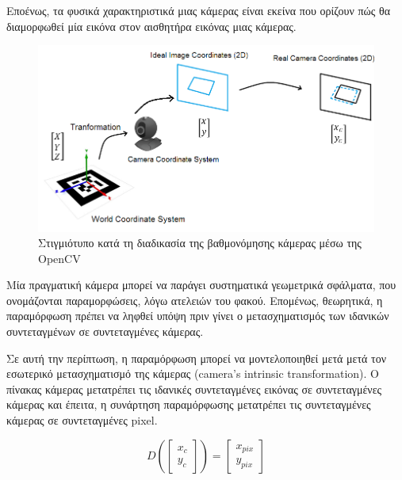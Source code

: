 Εποένως, τα φυσικά χαρακτηριστικά μιας κάμερας είναι εκείνα που ορίζουν πώς θα διαμορφωθεί μία εικόνα στον αισθητήρα εικόνας μιας κάμερας. 








\begin{figure}[H]
    \centering
    \includegraphics[scale=0.6, angle=0]{Files/Figures/transformation1.png}
    \caption[Στιγμιότυπο κατά τη διαδικασία της βαθμονόμησης κάμερας μέσω της OpenCV]{ Στιγμιότυπο κατά τη διαδικασία της βαθμονόμησης κάμερας μέσω της OpenCV}
    \label{fig:transformation1}
\end{figure}









Mία πραγματική κάμερα μπορεί να παράγει συστηματικά γεωμετρικά σφάλματα, που ονομάζονται παραμορφώσεις, λόγω ατελειών του φακού. 
Επομένως, θεωρητικά, η παραμόρφωση πρέπει να ληφθεί υπόψη πριν γίνει ο μετασχηματισμός των ιδανικών συντεταγμένων σε συντεταγμένες κάμερας. 



Σε αυτή την περίπτωση, η παραμόρφωση μπορεί να μοντελοποιηθεί μετά μετά τον εσωτερικό μετασχηματισμό της κάμερας (camera’s intrinsic transformation). Ο πίνακας κάμερας μετατρέπει τις ιδανικές συντεταγμένες εικόνας σε συντεταγμένες κάμερας και έπειτα, η συνάρτηση παραμόρφωσης μετατρέπει τις συντεταγμένες κάμερας σε συντεταγμένες pixel.

\begin{equation}
D
\left(
\begin{bmatrix}
x_{c}\\
y_{c}   
\end{bmatrix}
\right )
=
\begin{bmatrix}
x_{pix}\\
y_{pix}   
\end{bmatrix}
\end{equation} 


